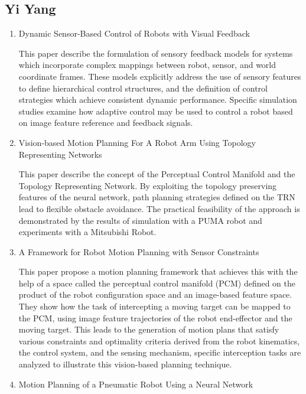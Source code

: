 \documentclass[10pt,twocolumn,letterpaper]{article}
\begin{document}
\subsection{Yi Yang}

\begin{enumerate}
\item Dynamic Sensor-Based Control of Robots with Visual Feedback

This paper describe the formulation of sensory feedback models for systems which incorporate complex mappings between robot, sensor, and world coordinate frames. These models explicitly address the use of sensory features to define hierarchical control structures, and the definition of control strategies which achieve consistent dynamic performance. Specific simulation studies examine how adaptive control may be used to control a robot based on image feature reference and feedback signals. 

\item Vision-based Motion Planning For A Robot Arm Using Topology Representing Networks

This paper describe the concept of the Perceptual Control Manifold and the Topology Representing Network. By exploiting the topology preserving features of the neural network, path planning strategies defined on the TRN lead to flexible obstacle avoidance. The practical feasibility of the approach is demonstrated by the results of simulation with a PUMA robot and experiments with a Mitsubishi Robot. 

\item A Framework for Robot Motion Planning with Sensor Constraints

This paper propose a motion planning framework that achieves this with the help of a space called the perceptual control manifold (PCM) defined on the product of the robot configuration space and an image-based feature space. They show how the task of intercepting a moving target can be mapped to the PCM, using image feature trajectories of the robot end-effector and the moving target. This leads to the generation of motion plans that satisfy various constraints and optimality criteria derived from the robot kinematics, the control system, and the sensing mechanism, specific interception tasks are analyzed to illustrate this vision-based planning technique. 

\item Motion Planning of a Pneumatic Robot Using a Neural Network


\end{enumerate}
\end{document}

